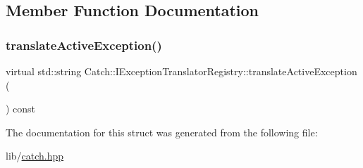 \subsection{Member Function Documentation}
\hypertarget{struct_catch_1_1_i_exception_translator_registry_af76ae8c331a17f2a94c9720bc0d686bb}{}\label{struct_catch_1_1_i_exception_translator_registry_af76ae8c331a17f2a94c9720bc0d686bb} 
\subsubsection{\texorpdfstring{translate\+Active\+Exception()}{translateActiveException()}}
{\footnotesize\ttfamily virtual std\+::string Catch\+::\+I\+Exception\+Translator\+Registry\+::translate\+Active\+Exception (\begin{DoxyParamCaption}{ }\end{DoxyParamCaption}) const\hspace{0.3cm}{\ttfamily [pure virtual]}}



The documentation for this struct was generated from the following file\+:\begin{DoxyCompactItemize}
\item 
lib/\hyperlink{catch_8hpp}{catch.\+hpp}\end{DoxyCompactItemize}
